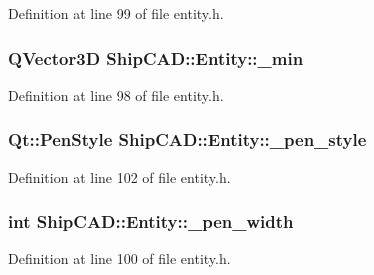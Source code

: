 Definition at line 99 of file entity.\-h.

\hypertarget{classShipCAD_1_1Entity_a414d4ff1ee308d47a5052910c3b34f7b}{
\subsubsection[{\-\_\-min}]{\setlength{\rightskip}{0pt plus 5cm}Q\-Vector3\-D Ship\-C\-A\-D\-::\-Entity\-::\-\_\-min\hspace{0.3cm}{\ttfamily [protected]}}}\label{classShipCAD_1_1Entity_a414d4ff1ee308d47a5052910c3b34f7b}


Definition at line 98 of file entity.\-h.

\hypertarget{classShipCAD_1_1Entity_ac53123be976cd9739ad1657573d67d97}{
\subsubsection[{\-\_\-pen\-\_\-style}]{\setlength{\rightskip}{0pt plus 5cm}Qt\-::\-Pen\-Style Ship\-C\-A\-D\-::\-Entity\-::\-\_\-pen\-\_\-style\hspace{0.3cm}{\ttfamily [protected]}}}\label{classShipCAD_1_1Entity_ac53123be976cd9739ad1657573d67d97}


Definition at line 102 of file entity.\-h.

\hypertarget{classShipCAD_1_1Entity_a5a9892a0d84d2cfdcd3a5dabf662a595}{
\subsubsection[{\-\_\-pen\-\_\-width}]{\setlength{\rightskip}{0pt plus 5cm}int Ship\-C\-A\-D\-::\-Entity\-::\-\_\-pen\-\_\-width\hspace{0.3cm}{\ttfamily [protected]}}}\label{classShipCAD_1_1Entity_a5a9892a0d84d2cfdcd3a5dabf662a595}


Definition at line 100 of file entity.\-h.



